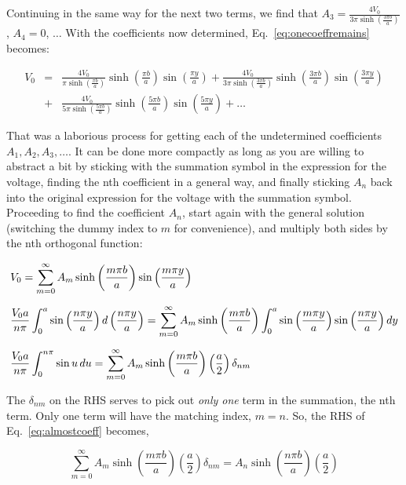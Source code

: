 \documentclass[12pt]{article}
\begin{document}
\begin{flushleft}
Continuing in the same way for the next two terms, we find that $A_{3}=\frac{4V_{0}}{3\pi \sinh{\left(\frac{3\pi b}{a}\right)}}$, $A_{4}=0$, $\dots$  With the coefficients now determined, Eq.~\ref{eq:onecoeffremains} becomes:

\begin{eqnarray}
V_{0} & = & \frac{4V_{0}}{\pi \sinh{\left( \frac{\pi b}{a} \right)}}\sinh{\left(\frac{\pi b}{a}\right)}\sin{\left(\frac{\pi y}{a}\right)} + \frac{4V_{0}}{3\pi \sinh{\left(\frac{3\pi b}{a}\right)}}\sinh{ \left(\frac{3\pi b}{a}\right) }\sin{ \left(\frac{3\pi y}{a}\right) } \nonumber \\[6pt]
& + & \frac{4V_{0}}{5\pi \sinh{\left(\frac{5\pi b}{a}\right)}}\sinh{ \left(\frac{5\pi b}{a}\right) }\sin{ \left(\frac{5\pi y}{a}\right) } +\ldots
\end{eqnarray}

That was a laborious process for getting each of the undetermined coefficients $A_{1}, A_{2}, A_{3}, \ldots$.  It can be done more compactly as long as you are willing to abstract a bit by sticking with the summation symbol in the expression for the voltage, finding the nth coefficient in a general way, and finally sticking $A_{n}$ back into the original expression for the voltage with the summation symbol.  Proceeding to find the coefficient $A_{n}$, start again with the general solution (switching the dummy index to $m$ for convenience), and multiply both sides by the nth orthogonal function:
 
\begin{align}
& V_{0} = \sum_{m=0}^{\infty} A_{m}\sinh{\left(\frac{m\pi b}{a}\right)}\sin{\left(\frac{m\pi y}{a}\right)} \notag \\[6pt]
&  \frac{V_{0}a}{n\pi} \int_{0}^{a} \sin{\left(\frac{n\pi y}{a}\right)} \, d\left(\frac{n\pi y}{a}\right) = \sum_{m=0}^{\infty} A_{m}\sinh{\left(\frac{m\pi b}{a}\right)} \int_{0}^{a} \sin{\left(\frac{m\pi y}{a}\right)}\sin{\left(\frac{n\pi y}{a}\right)} \, dy \notag \\[6pt]
&  \frac{V_{0}a}{n\pi} \int_{0}^{n\pi} \sin{u} \, du = \sum_{m=0}^{\infty} A_{m}\sinh{\left(\frac{m\pi b}{a}\right)} \left( \frac{a}{2}\right) \delta_{nm} \label{eq:almostcoeff}
\end{align}


The $\delta_{nm}$ on the RHS serves to pick out \textit{only one} term in the summation, the nth term.  Only one term will have the matching index, $m=n$.  So, the RHS of Eq.~\ref{eq:almostcoeff} becomes,

\begin{equation*}
\sum_{m=0}^{\infty} A_{m}\sinh{\left(\frac{m\pi b}{a}\right)} \left( \frac{a}{2}\right) \delta_{nm} = A_{n}\sinh{\left(\frac{n\pi b}{a}\right)} \left( \frac{a}{2}\right)
\end{equation*}


\end{flushleft}
\end{document}
